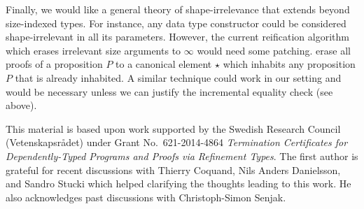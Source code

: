 \documentclass[acmlarge,review,anonymous]{acmart}\settopmatter{printfolios=true}
\begin{document}
Finally, we would like a general theory of shape-irrelevance that extends beyond size-indexed types.  For instance, any data type constructor could be considered shape-irrelevant in all its parameters.  However, the current reification algorithm which erases irrelevant size arguments to $\infty$ would need some patching.  \citet{abelCoquandPagano:lmcs11} erase all proofs of a proposition $P$ to a canonical element $\star$ which inhabits any proposition $P$ that is already inhabited.  A similar technique could work in our setting and would be necessary unless we can justify the incremental equality check (see above).






\begin{acks}                            %
  This material is based upon work supported by the
  Swedish Research Council (Vetenskapsr\aa{}det)
  under Grant
  No.~621-2014-4864 \emph{Termination Certificates for Dependently-Typed Programs and Proofs via Refinement Types}.
  The first author is grateful for recent discussions with Thierry Coquand, Nils Anders Danielsson, and Sandro Stucki
  which helped clarifying the thoughts leading to this work.
  He also acknowledges past discussions with Christoph-Simon Senjak.
\end{acks}

\clearpage





\end{document}
